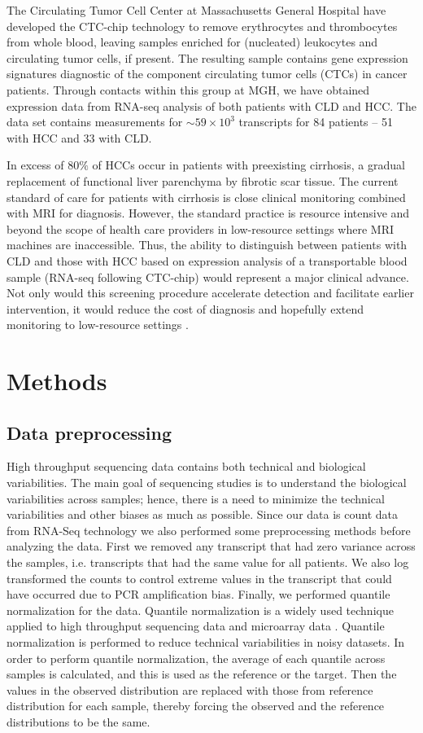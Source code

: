 \documentclass[a4paper]{article}
\begin{document}
	The Circulating Tumor Cell Center at Massachusetts General Hospital have developed the CTC-chip technology to remove erythrocytes and thrombocytes from whole blood, leaving samples enriched for (nucleated) leukocytes and circulating tumor cells, if present. The resulting sample contains gene expression signatures diagnostic of the component circulating tumor cells (CTCs) in cancer patients. Through contacts within this group at MGH, we have obtained expression data from RNA-seq analysis of both patients with CLD and HCC. The data set contains measurements for $\sim 59 \times 10^{3}$ transcripts for 84 patients -- 51 with HCC and 33 with CLD. 
	
	In excess of $80\%$ of HCCs occur in patients with preexisting cirrhosis, a gradual replacement of functional liver parenchyma by fibrotic scar tissue. The current standard of care for patients with cirrhosis is close clinical monitoring combined with MRI for diagnosis. However, the standard practice is resource intensive and beyond the scope of health care providers in low-resource settings where MRI machines are inaccessible. Thus, the ability to distinguish between patients with CLD and those with HCC based on expression analysis of a transportable blood sample (RNA-seq following CTC-chip) would represent a major clinical advance. Not only would this screening procedure accelerate detection and facilitate earlier intervention, it would reduce the cost of diagnosis and hopefully extend monitoring to low-resource settings \cite{davis2008hepatocellular}.
	
\section{Methods}
\subsection{Data preprocessing}
High throughput sequencing data contains both technical and biological variabilities. The main goal of sequencing studies is to understand the biological variabilities across samples; hence, there is a need to minimize the technical variabilities and other biases as much as possible. Since our data is count data from RNA-Seq technology we also performed some preprocessing methods before analyzing the data. First we removed any transcript that had zero variance across the samples, i.e. transcripts that had the same value for all patients. We also log transformed the counts to control extreme values in the transcript that could have occurred due to PCR amplification bias. Finally, we performed quantile normalization for the data. Quantile normalization is a widely used technique applied to high throughput sequencing data and microarray data \cite{bolstad2003comparison} \cite{hicks2015quantro}. Quantile normalization is performed to reduce technical variabilities in noisy datasets. In order to perform quantile normalization, the average of each quantile across samples is calculated, and this is used as the reference or the target. Then the values in the observed distribution are replaced with those from reference distribution for each sample, thereby forcing the observed and the reference distributions to be the same.
\end{document}
